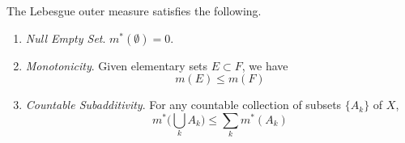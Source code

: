   \begin{lemma}
    The Lebesgue outer measure satisfies the following. 
    \begin{enumerate}
      \item \textit{Null Empty Set}. $m^\ast(\emptyset) = 0$. 
      \item \textit{Monotonicity}. Given elementary sets $E \subset F$, we have 
      \begin{equation}
        m(E) \leq m(F)
      \end{equation}
      \item \textit{Countable Subadditivity}. For any countable collection of subsets $\{A_k\}$ of $X$, 
      \begin{equation}
        m^\ast \bigg( \bigcup_k A_k \bigg) \leq \sum_{k} m^\ast (A_k) 
      \end{equation}
    \end{enumerate}
  \end{lemma}

